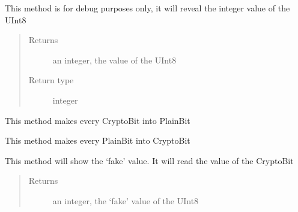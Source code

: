 \documentclass[letterpaper,10pt,english]{sphinxmanual}
\begin{document}
\begin{fulllineitems}

\begin{fulllineitems}
\label{datatypes.integers:datatypes.integers.UInt8.UInt8.debug_showValue}
This method is for debug purposes only, it will reveal the integer value of the UInt8
\begin{quote}\begin{description}
\item[{Returns}] \leavevmode
an integer, the value of the UInt8

\item[{Return type}] \leavevmode
integer

\end{description}\end{quote}

\end{fulllineitems}


\begin{fulllineitems}
\label{datatypes.integers:datatypes.integers.UInt8.UInt8.decrypt}
This method makes every CryptoBit into PlainBit

\end{fulllineitems}


\begin{fulllineitems}
\label{datatypes.integers:datatypes.integers.UInt8.UInt8.encrypt}
This method makes every PlainBit into CryptoBit

\end{fulllineitems}


\begin{fulllineitems}
\label{datatypes.integers:datatypes.integers.UInt8.UInt8.showValue}
This method will show the `fake' value. It will read the value of the CryptoBit
\begin{quote}\begin{description}
\item[{Returns}] \leavevmode
an integer, the `fake' value of the UInt8


\end{description}
\end{quote}
\end{fulllineitems}
\end{fulllineitems}
\end{document}
